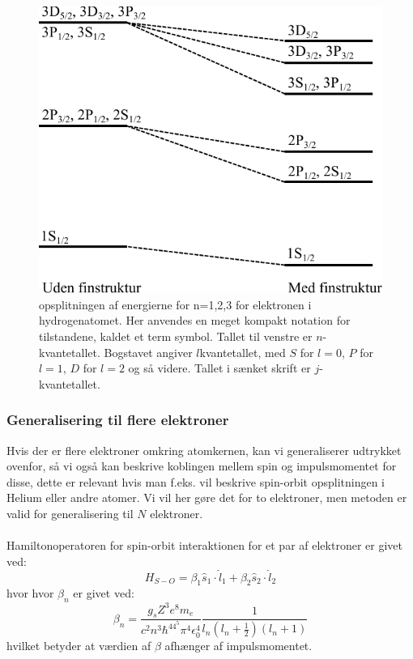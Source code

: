 \documentclass[../../Atom-ogMolekylefysik.tex]{subfiles}
\begin{document}
\begin{figure}[h]
    \centering
    \includegraphics[scale=1]{Atom-ogMolekylefysik/billeder/opsplitning.pdf}
    \caption{opsplitningen af energierne for n=1,2,3 for elektronen i hydrogenatomet. Her anvendes en meget kompakt notation for tilstandene, kaldet et term symbol. Tallet til venstre er $n$-kvantetallet. Bogstavet angiver $l$kvantetallet, med $S$ for $l=0$, $P$ for $l=1$, $D$ for $l=2$ og så videre. Tallet i sænket skrift er $j$-kvantetallet.}
\end{figure}

\subsubsection*{Generalisering til flere elektroner}
Hvis der er flere elektroner omkring atomkernen, kan vi generaliserer udtrykket ovenfor, så vi også kan beskrive koblingen mellem spin og impulsmomentet for disse, dette er relevant hvis man f.eks. vil beskrive spin-orbit opsplitningen i Helium eller andre atomer. Vi vil her gøre det for to elektroner, men metoden er valid for generalisering til $N$ elektroner.\\
\\
Hamiltonoperatoren for spin-orbit interaktionen for et par af elektroner er givet ved:
\begin{equation}
    H_{S-O}=\beta_{1}\hat{s}_1\cdot\hat{l}_1+\beta_2\hat{s}_2\cdot\hat{l}_2
\end{equation}
hvor
hvor $\beta_n$ er givet ved:
\begin{equation}
    \beta_n=\frac{g_sZ^3e^8m_e}{c^2n^3\hbar^44^5\pi^4\epsilon_0^4}\frac{1}{l_n(l_n+\frac{1}{2})(l_n+1)}
\end{equation}
hvilket betyder at værdien af $\beta$ afhænger af impulsmomentet.\\
\end{document}
